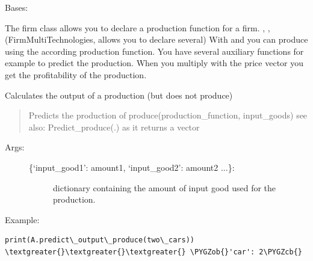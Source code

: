 \documentclass[letterpaper,10pt,english]{sphinxmanual}
\def\PYGZob{\char`\{}
\def\PYGZcb{\char`\}}
\begin{document}
\begin{fulllineitems}
\label{Firm:abce.Firm}
Bases: 

The firm class allows you to declare a production function for a firm.
, 
,
(FirmMultiTechnologies, allows you to declare several) With 
and  you can produce using the
according production function. You have several auxiliary functions
for example to predict the production. When you multiply
 with the price vector you get the
profitability of the production.

\begin{fulllineitems}
\label{Firm:abce.Firm.predict_produce_output_simple}
Calculates the output of a production (but does not produce)
\begin{quote}

Predicts the production of produce(production\_function, input\_goods)
see also: Predict\_produce(.) as it returns a vector
\end{quote}
\begin{description}
\item[{Args:}] \leavevmode\begin{description}
\item[{\{`input\_good1': amount1, `input\_good2': amount2 ...\}:}] \leavevmode
dictionary containing the amount of input good used for the production.

\end{description}

\end{description}

Example:

\begin{Verbatim}[commandchars=\\\{\}]
print(A.predict\_output\_produce(two\_cars))
\textgreater{}\textgreater{}\textgreater{} \PYGZob{}'car': 2\PYGZcb{}
\end{Verbatim}

\end{fulllineitems}



\end{fulllineitems}
\end{document}
